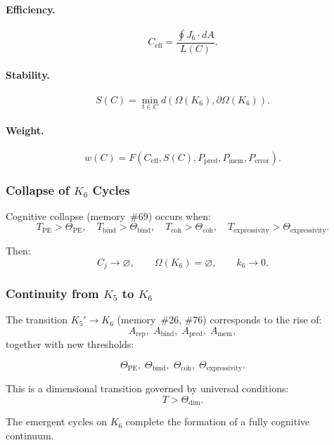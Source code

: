 \paragraph{Efficiency.}
\[
  C_{\mathrm{eff}}
    = \frac{\oint J_6\cdot dA}{L(C)}.
\]

\paragraph{Stability.}
\[
  S(C)
  = \min_{t\in C}
    d(\Omega(K_6),\partial\Omega(K_6)).
\]

\paragraph{Weight.}
\[
 w(C)
 = F(C_{\mathrm{eff}}, S(C), P_{\mathrm{pred}},
      P_{\mathrm{mem}}, P_{\mathrm{error}}).
\]

\subsubsection{Collapse of \texorpdfstring{$K_6$}{K_6} Cycles}

Cognitive collapse (memory~\#69) occurs when:
\[
  T_{\mathrm{PE}}>\Theta_{\mathrm{PE}},
  \quad
  T_{\mathrm{bind}}>\Theta_{\mathrm{bind}},
  \quad
  T_{\mathrm{coh}}>\Theta_{\mathrm{coh}},
  \quad
  T_{\mathrm{expressivity}}>\Theta_{\mathrm{expressivity}}.
\]

Then:
\[
 C_j \to \varnothing,
 \qquad
 \Omega(K_6)=\varnothing,
 \qquad
 k_6\to 0.
\]

\subsubsection{Continuity from \texorpdfstring{$K_5$}{K_5} to \texorpdfstring{$K_6$}{K_6}}

The transition $K_5' \to K_6$ (memory~\#26, \#76) corresponds to the rise
of:
\[
 A_{\mathrm{rep}},\;
 A_{\mathrm{bind}},\;
 A_{\mathrm{pred}},\;
 A_{\mathrm{mem}},
\]
together with new thresholds:

\[
 \Theta_{\mathrm{PE}},\;
 \Theta_{\mathrm{bind}},\;
 \Theta_{\mathrm{coh}},\;
 \Theta_{\mathrm{expressivity}}.
\]

This is a dimensional transition governed by universal conditions:
\[
  T > \Theta_{\mathrm{dim}}.
\]

The emergent cycles on $K_6$ complete the formation of a fully cognitive continuum.
